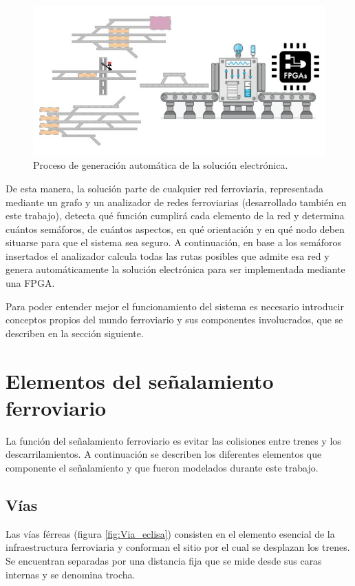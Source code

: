		\begin{figure}[htbp!]
			\centering
			\includegraphics[scale=.5]{./Figures/Generacion}
			\caption{Proceso de generación automática de la solución electrónica.}
			\label{fig:Generacion}
		\end{figure}
		
		De esta manera, la solución parte de cualquier red ferroviaria, representada mediante un grafo y un analizador de redes ferroviarias (desarrollado también en este trabajo), detecta qué función cumplirá cada elemento de la red y determina cuántos semáforos, de cuántos aspectos, en qué orientación y en qué nodo deben situarse para que el sistema sea seguro. A continuación, en base a los semáforos insertados el analizador calcula todas las rutas posibles que admite esa red y genera automáticamente la solución electrónica para ser implementada mediante una FPGA.
	
		Para poder entender mejor el funcionamiento del sistema es necesario introducir conceptos propios del mundo ferroviario y sus componentes involucrados, que se describen en la sección siguiente.

	\section{Elementos del señalamiento ferroviario}
	
		La función del señalamiento ferroviario es evitar las colisiones entre trenes y los descarrilamientos. A continuación se describen los diferentes elementos que componente el señalamiento y que fueron modelados durante este trabajo.
		
		\subsection{Vías}
			
			Las vías férreas (figura \ref{fig:Via_eclisa}) consisten en el elemento esencial de la infraestructura ferroviaria y conforman el sitio por el cual se desplazan los trenes. Se encuentran separadas por una distancia fija que se mide desde sus caras internas y se denomina trocha.
			
